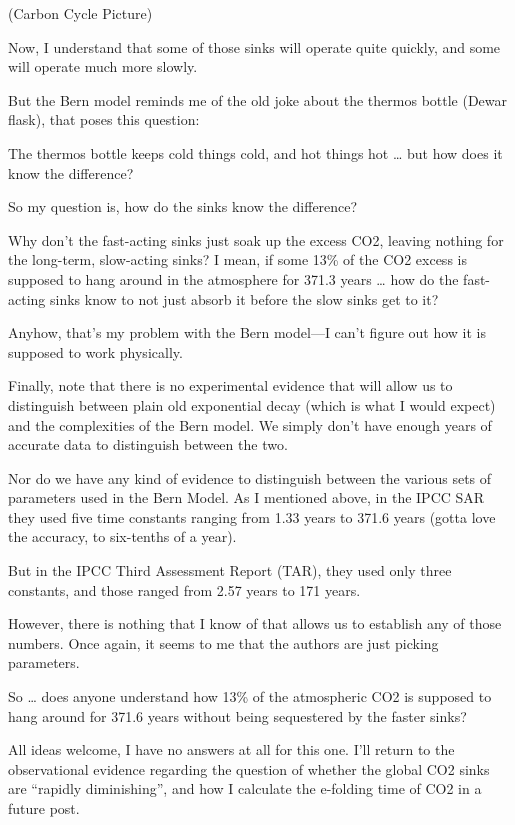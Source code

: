 \documentclass[
]{book}
\begin{document}
(Carbon Cycle Picture)

Now, I understand that some of those sinks will operate quite quickly, and some will operate much more slowly.

But the Bern model reminds me of the old joke about the thermos bottle (Dewar flask), that poses this question:

The thermos bottle keeps cold things cold, and hot things hot \ldots{} but how does it know the difference?

So my question is, how do the sinks know the difference?

Why don't the fast-acting sinks just soak up the excess CO2, leaving nothing for the long-term, slow-acting sinks? I mean, if some 13\% of the CO2 excess is supposed to hang around in the atmosphere for 371.3 years \ldots{} how do the fast-acting sinks know to not just absorb it before the slow sinks get to it?

Anyhow, that's my problem with the Bern model---I can't figure out how it is supposed to work physically.

Finally, note that there is no experimental evidence that will allow us to distinguish between plain old exponential decay (which is what I would expect) and the complexities of the Bern model. We simply don't have enough years of accurate data to distinguish between the two.

Nor do we have any kind of evidence to distinguish between the various sets of parameters used in the Bern Model. As I mentioned above, in the IPCC SAR they used five time constants ranging from 1.33 years to 371.6 years (gotta love the accuracy, to six-tenths of a year).

But in the IPCC Third Assessment Report (TAR), they used only three constants, and those ranged from 2.57 years to 171 years.

However, there is nothing that I know of that allows us to establish any of those numbers. Once again, it seems to me that the authors are just picking parameters.

So \ldots{} does anyone understand how 13\% of the atmospheric CO2 is supposed to hang around for 371.6 years without being sequestered by the faster sinks?

All ideas welcome, I have no answers at all for this one. I'll return to the observational evidence regarding the question of whether the global CO2 sinks are ``rapidly diminishing'', and how I calculate the e-folding time of CO2 in a future post.
\end{document}
